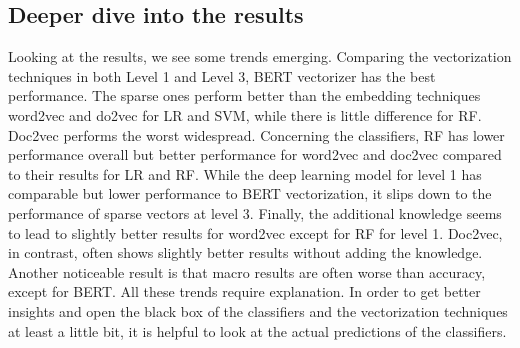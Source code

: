\documentclass[12pt, a4paper, titlepage]{article}
\begin{document}
\subsection{Deeper dive into the results}
Looking at the results, we see some trends emerging. Comparing the vectorization techniques in both Level 1 and Level 3, \ac{BERT} vectorizer has the best performance. The sparse ones perform better than the embedding techniques word2vec and do2vec for LR and SVM, while there is little difference for RF. Doc2vec performs the worst widespread. Concerning the classifiers, \ac{RF} has lower performance overall but better performance for word2vec and doc2vec compared to their results for LR and RF. While the deep learning model for level 1 has comparable but lower performance to BERT vectorization, it slips down to the performance of sparse vectors at level 3. Finally, the additional knowledge seems to lead to slightly better results for word2vec except for \ac{RF} for level 1. Doc2vec, in contrast, often shows slightly better results without adding the knowledge. Another noticeable result is that macro results are often worse than accuracy, except for BERT. All these trends require explanation. In order to get better insights and open the black box of the classifiers and the vectorization techniques at least a little bit, it is helpful to look at the actual predictions of the classifiers.
\end{document}
